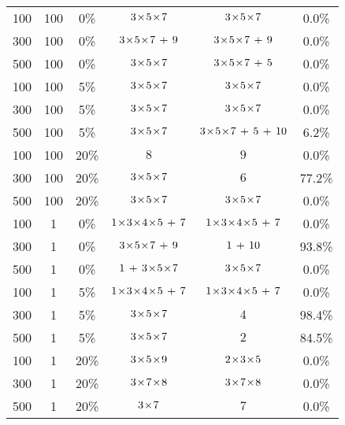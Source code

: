 \begin{table*}[!t]
\begin{center}
{{\begin{tabular}{c c  c | c |  c | c  }
100	&	100	&	 0\% 	&	 ${3} \! \times \! {5} \! \times \! {7}$ 	&	 	${3} \! \times \! {5} \! \times \! {7}$ &	  0.0\%  \\ 	
300	&	100	&	 0\% 	&	 ${3} \! \times \! {5} \! \times \! {7} \, + \, {9}$ 	&	 	${3} \! \times \! {5} \! \times \! {7} \, + \, {9}$ 	&  0.0\%  \\ 	
500	&	100	&	 0\% 	&	 ${3} \! \times \! {5} \! \times \! {7}$ 	&	 	${3} \! \times \! {5} \! \times \! {7} \, + \, {5}$ 	 & 0.0\%  \\  \hline	
100	&	100	&	 5\% 	&	 ${3} \! \times \! {5} \! \times \! {7}$ 	&	 	${3} \! \times \! {5} \! \times \! {7}$ 	&  0.0\%  \\ 	
300	&	100	&	 5\% 	&	 ${3} \! \times \! {5} \! \times \! {7}$ 	&	 	${3} \! \times \! {5} \! \times \! {7}$ 	&  0.0\%  \\ 	
500	&	100	&	 5\% 	&	 ${3} \! \times \! {5} \! \times \! {7}$ 	&	 	${3} \! \times \! {5} \! \times \! {7} \, + \, {5} \, + \, {10}$ &	  6.2\%  \\  \hline	
100	&	100	&	 20\% 	&	 ${8}$ 	&	 	${9}$ &	  0.0\%  \\ 	
300	&	100	&	 20\% 	&	 ${3} \! \times \! {5} \! \times \! {7}$ 	&	 	${6}$ &	  77.2\%  \\ 	
500	&	100	&	 20\% 	&	 ${3} \! \times \! {5} \! \times \! {7}$ 	&	 	${3} \! \times \! {5} \! \times \! {7}$ 	&  0.0\%  \\  \hline	
100	&	1	&	 0\% 	&	 ${1} \! \times \! {3} \! \times \! {4} \! \times \! {5} \, + \, {7}$ 	&	 	${1} \! \times \! {3} \! \times \! {4} \! \times \! {5} \, + \, {7}$ &	  0.0\%  \\ 	
300	&	1	&	 0\% 	&	 ${3} \! \times \! {5} \! \times \! {7} \, + \, {9}$ 	&	 	${1} \, + \, {10}$ 	&  93.8\%  \\ 	
500	&	1	&	 0\% 	&	 ${1} \, + \, {3} \! \times \! {5} \! \times \! {7}$ 	&	 	${3} \! \times \! {5} \! \times \! {7}$ 	&  0.0\%  \\ \hline	
100	&	1	&	 5\% 	&	 ${1} \! \times \! {3} \! \times \! {4} \! \times \! {5} \, + \, {7}$ 	&	 	${1} \! \times \! {3} \! \times \! {4} \! \times \! {5} \, + \, {7}$ &	  0.0\%  \\ 	
300	&	1	&	 5\% 	&	 ${3} \! \times \! {5} \! \times \! {7}$ 	&	 	${4}$ 	&  98.4\%  \\ 	
500	&	1	&	 5\% 	&	 ${3} \! \times \! {5} \! \times \! {7}$ 	&	 	${2}$ 	 & 84.5\%  \\ \hline	
100	&	1	&	 20\% 	&	 ${3} \! \times \! {5} \! \times \! {9}$ 	&	 	${2} \! \times \! {3} \! \times \! {5}$ &	  0.0\%  \\ 	
300	&	1	&	 20\% 	&	 ${3} \! \times \! {7} \! \times \! {8}$ 	&	 	${3} \! \times \! {7} \! \times \! {8}$ &	  0.0\%  \\ 	
500	&	1	&	 20\% 	&	 ${3} \! \times \! {7}$ 	&	 	${7}$ 	 & 0.0\%  \\ 	

\end{tabular}
} }

\end{center}
\end{table*}
